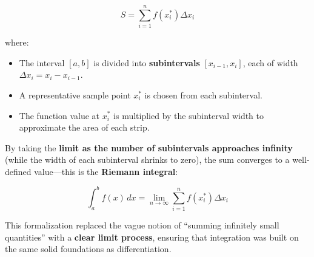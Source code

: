 \[
S = \sum_{i=1}^{n} f(x_i^*) \Delta x_i
\]

where:  
\begin{itemize}
    \item The interval \([a, b]\) is divided into \textbf{subintervals} \([x_{i-1}, x_i]\), each of width \( \Delta x_i = x_i - x_{i-1} \).  
    \item A representative sample point \( x_i^* \) is chosen from each subinterval.  
    \item The function value at \( x_i^* \) is multiplied by the subinterval width to approximate the area of each strip.  
\end{itemize}

\begin{center}
\end{center}


By taking the \textbf{limit as the number of subintervals approaches infinity} (while the width of each subinterval shrinks to zero), the sum converges to a well-defined value—this is the \textbf{Riemann integral}:  

\[
\int_a^b f(x) \,dx = \lim_{n \to \infty} \sum_{i=1}^{n} f(x_i^*) \Delta x_i
\]

This formalization replaced the vague notion of “summing infinitely small quantities” with a \textbf{clear limit process}, ensuring that integration was built on the same solid foundations as differentiation.  







